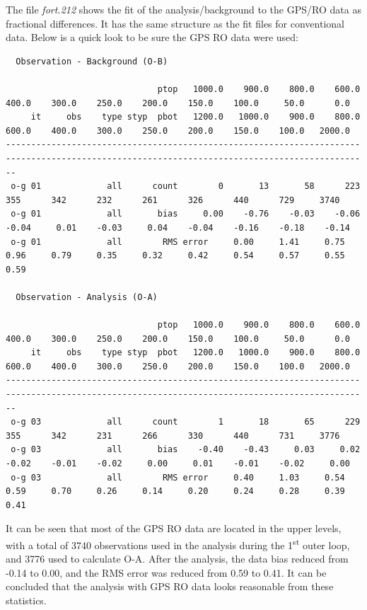 The file \textit{fort.212} shows the fit of the analysis/background to the GPS/RO data as fractional differences.  It has the same structure as the fit files for conventional data.  Below is a quick look to be sure the GPS RO data were used:

\begin{tiny}
\begin{verbatim}
  Observation - Background (O-B)

                              ptop   1000.0    900.0    800.0    600.0    400.0    300.0    250.0    200.0    150.0    100.0     50.0      0.0
     it     obs    type styp  pbot   1200.0   1000.0    900.0    800.0    600.0    400.0    300.0    250.0    200.0    150.0    100.0   2000.0
----------------------------------------------------------------------------------------------------------------------------------------------
 o-g 01             all      count        0       13       58      223      355      342      232      261      326      440      729     3740
 o-g 01             all       bias     0.00    -0.76    -0.03    -0.06    -0.04     0.01    -0.03     0.04    -0.04    -0.16    -0.18    -0.14
 o-g 01             all        RMS error     0.00     1.41     0.75     0.96     0.79     0.35     0.32     0.42     0.54     0.57     0.55     0.59

  Observation - Analysis (O-A)

                              ptop   1000.0    900.0    800.0    600.0    400.0    300.0    250.0    200.0    150.0    100.0     50.0      0.0
     it     obs    type styp  pbot   1200.0   1000.0    900.0    800.0    600.0    400.0    300.0    250.0    200.0    150.0    100.0   2000.0
----------------------------------------------------------------------------------------------------------------------------------------------
 o-g 03             all      count        1       18       65      229      355      342      231      266      330      440      731     3776
 o-g 03             all       bias    -0.40    -0.43     0.03     0.02    -0.02    -0.01    -0.02     0.00     0.01    -0.01    -0.02     0.00
 o-g 03             all        RMS error     0.40     1.03     0.54     0.59     0.70     0.26     0.14     0.20     0.24     0.28     0.39     0.41
\end{verbatim}
\end{tiny}

It can be seen that most of the GPS RO data are located in the upper levels, with a total of 3740 observations used in the analysis during the 1\textsuperscript{st} outer loop, and 3776 used to calculate O-A. After the analysis, the data bias reduced from -0.14 to 0.00, and the RMS error was reduced from 0.59 to 0.41. It can be concluded that the analysis with GPS RO data looks reasonable from these statistics.  

